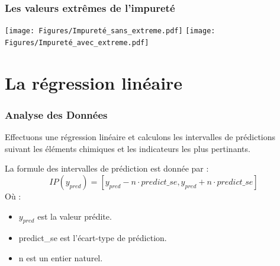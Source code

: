 \documentclass[aspectratio=169]{beamer}
\begin{document}
\begin{frame}
\frametitle{Les valeurs extrêmes de l'impureté}
    \texttt{[image: Figures/Impureté\_sans\_extreme.pdf]}
    \texttt{[image: Figures/Impureté\_avec\_extreme.pdf]}
\end{frame}



\section{La régression linéaire }

\begin{frame}
\frametitle{Analyse des Données}
Effectuons une régression linéaire et calculons les intervalles de  prédictions 
suivant les éléments chimiques et les indicateurs les plus pertinants.


\medskip %

La formule des intervalles de prédiction est donnée par :
$$
IP (y_{pred}) = [y_{pred} - n \cdot predict\_se, y_{pred} + n \cdot predict\_se]
$$
Où :
\begin{itemize}
    \item $y_{pred}$ est la valeur prédite.
    \item predict\_se est  l'écart-type de prédiction.
    \item  n  est un entier naturel.
\end{itemize}

\end{frame}
\end{document}
